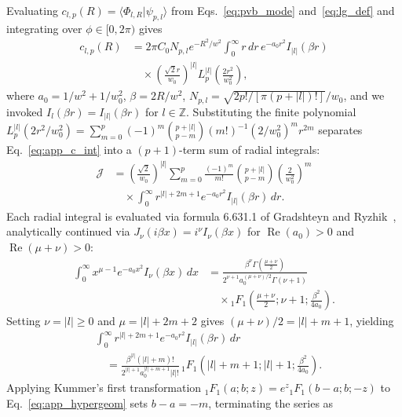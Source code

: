\documentclass[aps,pra,reprint,amsmath,amssymb,floatfix,longbibliography]{revtex4-2}
\providecommand{\braket}[2]{\langle#1\vert#2\rangle}
\providecommand{\abs}[1]{\lvert#1\rvert}
\begin{document}
Evaluating $c_{l,p}(R) = \braket{\Phi_{l,R}}{\psi_{p,l}}$ from Eqs.~\eqref{eq:pvb_mode} and~\eqref{eq:lg_def} and integrating over $\phi \in [0,2\pi)$ gives
\begin{align}
c_{l,p}(R) &= 2\pi C_0 N_{p,l} e^{-R^2/w^2} \int_0^\infty r\,dr\, e^{-a_0 r^2} I_{\abs{l}}(\beta r) \nonumber \\
&\quad \times \left(\frac{\sqrt{2}r}{w_0}\right)^{\abs{l}} L_p^{\abs{l}}\!\left(\frac{2r^2}{w_0^2}\right),
\label{eq:app_c_int}
\end{align}
where $a_0 = 1/w^2 + 1/w_0^2$, $\beta = 2R/w^2$, $N_{p,l} = \sqrt{2p!/[\pi(p+\abs{l})!]}/w_0$, and we invoked $I_l(\beta r) = I_{\abs{l}}(\beta r)$ for $l \in \mathbb{Z}$. Substituting the finite polynomial $L_p^{\abs{l}}(2r^2/w_0^2) = \sum_{m=0}^p (-1)^m \binom{p+\abs{l}}{p-m} (m!)^{-1} (2/w_0^2)^m r^{2m}$ separates Eq.~\eqref{eq:app_c_int} into a $(p+1)$-term sum of radial integrals:
\begin{align}
\mathcal{J} &= \left(\frac{\sqrt{2}}{w_0}\right)^{\abs{l}} \sum_{m=0}^p \frac{(-1)^m}{m!}\binom{p+\abs{l}}{p-m}\left(\frac{2}{w_0^2}\right)^m \nonumber \\
&\quad \times \int_0^\infty r^{\abs{l}+2m+1} e^{-a_0 r^2} I_{\abs{l}}(\beta r)\,dr.
\label{eq:app_J_sum}
\end{align}
Each radial integral is evaluated via formula 6.631.1 of Gradshteyn and Ryzhik~\cite{Gradshteyn2014}, analytically continued via $J_\nu(i\beta x) = i^\nu I_\nu(\beta x)$ for $\operatorname{Re}(a_0) > 0$ and $\operatorname{Re}(\mu+\nu) > 0$:
\begin{align*}
\int_0^\infty x^{\mu-1} e^{-a_0 x^2} I_\nu(\beta x)\,dx &= \frac{\beta^\nu \Gamma\left(\frac{\mu+\nu}{2}\right)}{2^{\nu+1} a_0^{(\mu+\nu)/2} \Gamma(\nu+1)} \\
&\quad \times {_1F_1}\!\left(\frac{\mu+\nu}{2}; \nu+1; \frac{\beta^2}{4a_0}\right).
\end{align*}
Setting $\nu = \abs{l} \ge 0$ and $\mu = \abs{l} + 2m + 2$ gives $(\mu+\nu)/2 = \abs{l} + m + 1$, yielding
\begin{align}
&\int_0^\infty r^{\abs{l}+2m+1} e^{-a_0 r^2} I_{\abs{l}}(\beta r)\,dr \nonumber \\
&\quad = \frac{\beta^{\abs{l}}(\abs{l}+m)!}{2^{\abs{l}+1} a_0^{\abs{l}+m+1}\abs{l}!}\,{_1F_1}\!\left(\abs{l}+m+1; \abs{l}+1; \frac{\beta^2}{4a_0}\right).
\label{eq:app_hypergeom}
\end{align}
Applying Kummer's first transformation ${_1F_1}(a;b;z) = e^z {_1F_1}(b-a;b;-z)$ to Eq.~\eqref{eq:app_hypergeom} sets $b - a = -m$, terminating the series as
\end{document}
